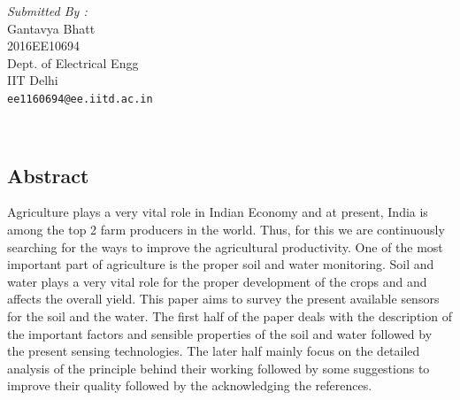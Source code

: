 \documentclass[11pt]{article}
\begin{document}
\begin{titlepage}
\begin{minipage}{0.4\textwidth}
			\begin{flushright} \large
			\emph{Submitted By :} \\
            Gantavya Bhatt\\
            2016EE10694\\
			Dept. of Electrical Engg\\
            IIT Delhi\\
            \texttt{ee1160694@ee.iitd.ac.in}
		\end{flushright}
        
	\end{minipage}\\[2 cm]
	
\end{titlepage}


\tableofcontents
\pagebreak
% 
\begin{center}
    \section*{Abstract}
Agriculture plays a very vital role in Indian Economy and at present, India is among the top 2 farm producers in the world. Thus, for this we are continuously searching for the ways to improve the agricultural productivity. One of the most important part of agriculture is the proper soil and water monitoring. Soil and water plays a very vital role for the proper development of the crops and and affects the overall yield. This paper aims to survey the present available sensors for the soil and the water. The first half of the paper deals with the description of the important factors and sensible properties of the soil and water followed by the present sensing technologies. The later half mainly focus on the detailed analysis of the principle behind their working followed by some suggestions to improve their quality followed by the acknowledging the references.     
\end{center}

%
%
\end{document}

